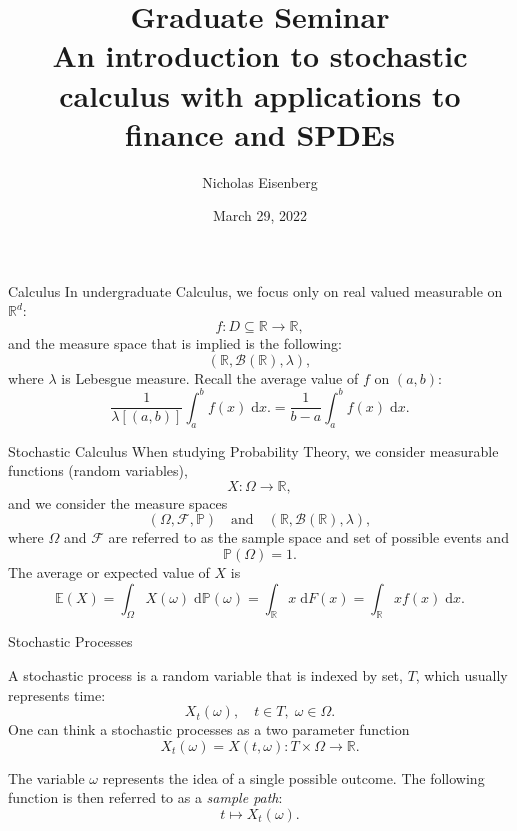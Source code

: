 \documentclass{beamer}%
\title[About Beamer] %
{Graduate Seminar \\
	An introduction to stochastic calculus with applications to finance and SPDEs}
\author[Arthur, Doe] %
{Nicholas Eisenberg}
\date[VLC 2021] %
{ \small March 29, 2022 
}
\numberwithin{equation}{section}
\newcommand{\R}{\mathbb{R}}
\newcommand{\ud}{\ensuremath{\mathrm{d} }}
\begin{document}
	\frame{\titlepage}	
	\setcounter{page}{1}
	
	\begin{frame}[t]{Calculus}
		In undergraduate Calculus, we focus only on real valued measurable on $\R^d$:
		\[
		f : D \subseteq \R \to \R,
		\]
		and the measure space that is implied is the following:
		\[
		(\R, \mathscr{B}(\R), \lambda),
		\]
		where $\lambda$ is Lebesgue measure. Recall the average value of $f$ on $(a,b)$:
		\[
		\frac{1}{\lambda[(a,b)]} \int_a^b f(x) \; \ud x.= \frac{1}{b-a} \int_a^b f(x) \; \ud x.
		\]
	\end{frame}
	
	\begin{frame}[t]{Stochastic Calculus}
		When studying Probability Theory, we consider measurable functions (random variables),
		\[
		X : \Omega \to \R,
		\]
		and we consider the measure spaces 
		\[
		(\Omega, \mathcal{F}, \mathbb{P}) \quad \text{and} \quad (\R, \mathscr{B}(\R), \lambda),
		\]
		where $\Omega$ and $\mathcal{F}$ are referred to as the sample space and set of possible events and
		\[
		\mathbb{P}(\Omega) = 1.
		\]
		The average or expected value of $X$ is 
		\[
		\mathbb{E}(X) = \int_{\Omega} X(\omega) \; \ud\mathbb{P}(\omega) = \int_{\R} x \;\ud F(x) = \int_{\R} x f(x) \;\ud x.
		\]
	\end{frame}
	
	\begin{frame}{Stochastic Processes}
		\begin{definition}
			A stochastic process is a random variable that is indexed by set, $T$, which usually represents time:
			\[
			X_t(\omega), \quad t \in T, \; \omega \in \Omega.
			\]
			One can think a stochastic processes as a two parameter function
			\[
			X_t(\omega) = X(t,\omega): T \times \Omega \to \R.
			\]
		\end{definition}
		\begin{definition}
			The variable $\omega$ represents the idea of a single possible outcome. The following function is then referred to as a {\it sample path}:
			\[
			t \mapsto X_t(\omega).
			\]
		\end{definition}
		
	\end{frame}
	
\end{document}

